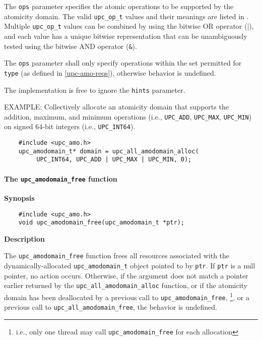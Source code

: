 \np The {\tt ops} parameter specifies the atomic operations to be supported by
    the atomicity domain.  The valid {\tt upc\_op\_t} values and their meanings
    are listed in \upcopsection{}.  Multiple {\tt upc\_op\_t} values
    can be combined by using the bitwise OR operator ($|$), and each value has
    a unique bitwise representation that can be unambiguously tested using the
    bitwise AND operator ({\tt \&}).

\np The {\tt ops} parameter shall only specify operations within the set
    permitted for {\tt type} (as defined in \ref{upc-amo-reqs}), otherwise
    behavior is undefined.

\np The implementation is free to ignore the {\tt hints} parameter.

\np EXAMPLE: Collectively allocate an atomicity domain that supports the
    addition, maximum, and minimum operations (i.e., {\tt UPC\_ADD},
    {\tt UPC\_MAX}, {\tt UPC\_MIN}) on signed 64-bit integers (i.e.,
    {\tt UPC\_INT64}).
\begin{verbatim}
    #include <upc_amo.h>
    upc_amodomain_t* domain = upc_all_amodomain_alloc(
         UPC_INT64, UPC_ADD | UPC_MAX | UPC_MIN, 0);
\end{verbatim}

\paragraph{The {\tt upc\_amodomain\_free} function}

{\bf Synopsis}

\npf\vspace{-1.8em}
\begin{verbatim}
    #include <upc_amo.h>
    void upc_amodomain_free(upc_amodomain_t *ptr);
\end{verbatim}

{\bf Description}

\np The {\tt upc\_amodomain\_free} function frees all resources associated with
    the dynamically-allocated {\tt upc\_amodomain\_t} object pointed to by
    {\tt ptr}.  If {\tt ptr} is a null pointer, no action occurs.  Otherwise,
    if the argument does not match a pointer earlier returned by the
    {\tt upc\_all\_amodomain\_alloc} function, or if the atomicity domain has
    been deallocated by a previous call to {\tt upc\_amodomain\_free},%
    \footnote{i.e., only one thread may call {\tt upc\_amodomain\_free} for
    each allocation}, or a previous call to {\tt upc\_all\_amodomain\_free},
    the behavior is undefined.


